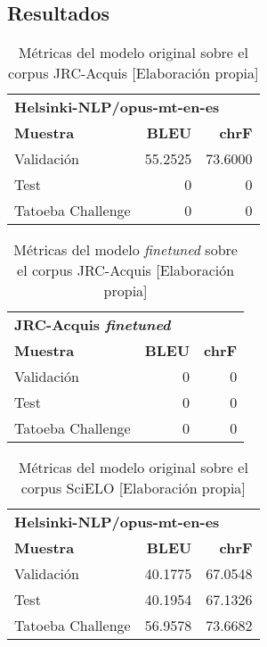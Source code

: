\subsection{Resultados}
\begin{table}[H]
    \begin{center}
        \begin{tabular}{ l r r }
        \multicolumn{3}{l}{\textbf{Helsinki-NLP/opus-mt-en-es}}\\
        \textbf{Muestra} & \textbf{BLEU} & \textbf{chrF} \\
        Validación & 55.2525 & 73.6000 \\
        Test & 0 & 0 \\
        Tatoeba Challenge & 0 & 0
        \end{tabular}
        \caption{Métricas del modelo original sobre el corpus JRC-Acquis [Elaboración propia]}\label{originalacquis}
    \end{center}
\end{table}

\begin{table}[H]
    \begin{center}
        \begin{tabular}{ l r r }
        \multicolumn{3}{l}{\textbf{JRC-Acquis \textit{finetuned}}}\\
        \textbf{Muestra} & \textbf{BLEU} & \textbf{chrF} \\
        Validación & 0 & 0 \\ %
        Test & 0 & 0 \\
        Tatoeba Challenge & 0 & 0
        \end{tabular}
        \caption{Métricas del modelo \textit{finetuned} sobre el corpus JRC-Acquis [Elaboración propia]}\label{finetuneacquis}
    \end{center}
\end{table}

\begin{table}[H]
    \begin{center}
        \begin{tabular}{ l r r }
        \multicolumn{3}{l}{\textbf{Helsinki-NLP/opus-mt-en-es}}\\
        \textbf{Muestra} & \textbf{BLEU} & \textbf{chrF} \\
        Validación & 40.1775 & 67.0548 \\ %
        Test & 40.1954 & 67.1326 \\
        Tatoeba Challenge & 56.9578 & 73.6682
        \end{tabular}
        \caption{Métricas del modelo original sobre el corpus SciELO [Elaboración propia]}\label{originalscielo}
    \end{center}
\end{table}

